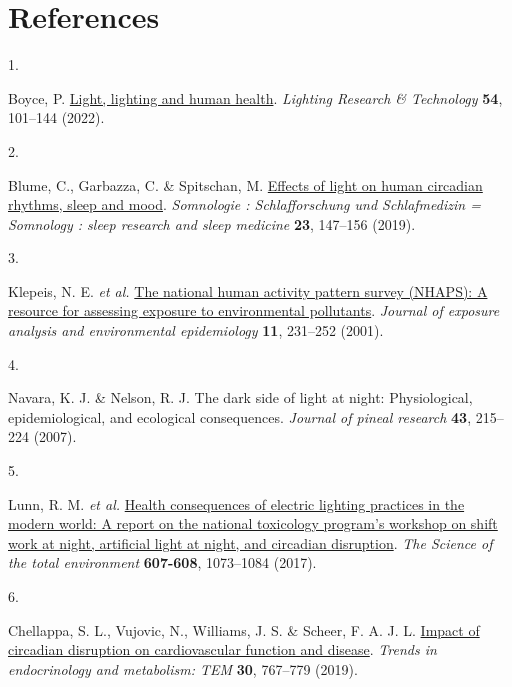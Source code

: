 \documentclass[
  man]{apa6}
\newlength{\cslhangindent}
\newlength{\csllabelwidth}
\newlength{\cslentryspacingunit} %
\newenvironment{CSLReferences}[2] %
 {%
  \setlength{\parindent}{0pt}
  \ifodd #1
  \let\oldpar\par
  \def\par{\hangindent=\cslhangindent\oldpar}
  \fi
  \setlength{\parskip}{#2\cslentryspacingunit}
 }%
 {}
\newcommand{\CSLLeftMargin}[1]{\parbox[t]{\csllabelwidth}{#1}}
\newcommand{\CSLRightInline}[1]{\parbox[t]{\linewidth - \csllabelwidth}{#1}\break}
\begin{document}
\newpage

\hypertarget{references}{%
\section{References}\label{references}}

\begingroup
\setlength{\parindent}{-0.5in}
\setlength{\leftskip}{0.5in}

\hypertarget{refs}{}
\begin{CSLReferences}{0}{0}
\leavevmode{}%
\CSLLeftMargin{1. }%
\CSLRightInline{Boyce, P. \href{https://doi.org/10.1177/14771535211010267}{Light, lighting and human health}. \emph{Lighting Research \& Technology} \textbf{54}, 101--144 (2022).}

\leavevmode{}%
\CSLLeftMargin{2. }%
\CSLRightInline{Blume, C., Garbazza, C. \& Spitschan, M. \href{https://doi.org/10.1007/s11818-019-00215-x}{Effects of light on human circadian rhythms, sleep and mood}. \emph{Somnologie : Schlafforschung und Schlafmedizin = Somnology : sleep research and sleep medicine} \textbf{23}, 147--156 (2019).}

\leavevmode{}%
\CSLLeftMargin{3. }%
\CSLRightInline{Klepeis, N. E. \emph{et al.} \href{https://doi.org/10.1038/sj.jea.7500165}{The national human activity pattern survey (NHAPS): A resource for assessing exposure to environmental pollutants}. \emph{Journal of exposure analysis and environmental epidemiology} \textbf{11}, 231--252 (2001).}

\leavevmode{}%
\CSLLeftMargin{4. }%
\CSLRightInline{Navara, K. J. \& Nelson, R. J. The dark side of light at night: Physiological, epidemiological, and ecological consequences. \emph{Journal of pineal research} \textbf{43}, 215--224 (2007).}

\leavevmode{}%
\CSLLeftMargin{5. }%
\CSLRightInline{Lunn, R. M. \emph{et al.} \href{https://doi.org/10.1016/j.scitotenv.2017.07.056}{Health consequences of electric lighting practices in the modern world: A report on the national toxicology program's workshop on shift work at night, artificial light at night, and circadian disruption}. \emph{The Science of the total environment} \textbf{607-608}, 1073--1084 (2017).}

\leavevmode{}%
\CSLLeftMargin{6. }%
\CSLRightInline{Chellappa, S. L., Vujovic, N., Williams, J. S. \& Scheer, F. A. J. L. \href{https://doi.org/10.1016/j.tem.2019.07.008}{Impact of circadian disruption on cardiovascular function and disease}. \emph{Trends in endocrinology and metabolism: TEM} \textbf{30}, 767--779 (2019).}


\end{CSLReferences}
\end{document}
